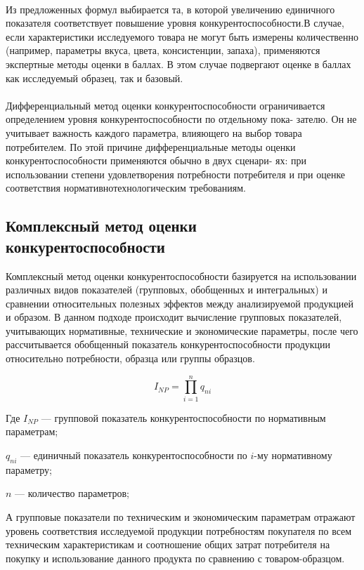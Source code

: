 \documentclass[14pt, a4paper]{extarticle}
\begin{document}
\begin{enumerate}
    \paragraph[short]{}
    Из предложенных формул выбирается та, в которой увеличению единичного
     показателя соответствует повышение уровня конкурентоспособности.В случае,
     если характеристики исследуемого товара не могут быть
     измерены количественно (например, параметры вкуса, цвета, консистенции, 
     запаха), применяются экспертные методы оценки в баллах. В этом
     случае подвергают оценке в баллах как исследуемый образец, так и базовый.
  \paragraph[short]{}
    Дифференциальный метод оценки конкурентоспособности ограничивается определением уровня конкурентоспособности по отдельному пока-
     зателю. Он не учитывает важность каждого параметра, влияющего на
     выбор товара потребителем. По этой причине дифференциальные методы оценки конкурентоспособности применяются обычно в двух сценари-
     ях: при использовании степени удовлетворения потребности потребителя
     и при оценке соответствия нормативнотехнологическим требованиям.
  \end{enumerate}
  \newpage
  \subsection{Комплексный метод оценки конкурентоспособности}

  Комплексный метод оценки конкурентоспособности базируется на использовании различных видов показателей (групповых, обобщенных и интегральных) и сравнении относительных полезных эффектов между анализируемой продукцией и образом. В данном подходе происходит вычисление групповых показателей, учитывающих нормативные, технические и экономические параметры, после чего рассчитывается обобщенный показатель конкурентоспособности продукции относительно потребности, образца или группы образцов.
  
  \[
  I_{NP} = \prod_{i=1}^n q_{ni}
  \]
  
  Где \(I_{NP}\) — групповой показатель конкурентоспособности по нормативным параметрам;
  
  \(q_{ni}\) — единичный показатель конкурентоспособности по \(i\)-му нормативному параметру;
  
  \(n\) — количество параметров;
  
  А групповые показатели по техническим и экономическим параметрам отражают уровень соответствия исследуемой продукции потребностям покупателя по всем техническим характеристикам и соотношение общих затрат потребителя на покупку и использование данного продукта по сравнению с товаром-образцом.
  
\end{document}
